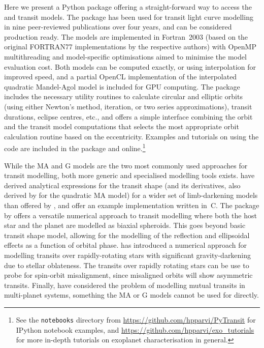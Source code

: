 \documentclass[usenatbib,usegraphicx,useAMS]{mn2e}
\begin{document}
Here we present a Python package offering a straight-forward way to access the \citet{Gimenez2006} and 
\cite{Mandel2002} transit models.  The package has been used for transit light curve modelling in nine
peer-reviewed publications over four years, and can be considered production ready. The models are implemented in
Fortran~2003 (based on the original FORTRAN77 implementations by the respective authors) with OpenMP multithreading and
model-specific optimisations aimed to minimise the model evaluation cost. Both models can be computed exactly, or using
interpolation for improved speed, and a partial OpenCL implementation of the interpolated quadratic Mandel-Agol model is
included for GPU computing. The package includes the necessary utility routines to calculate circular and elliptic
orbits (using either Newton's method, iteration, or two series approximations), transit durations, eclipse centres,
etc., and offers a simple interface combining the orbit and the transit model computations that selects the most
appropriate orbit calculation routine based on the eccentricity. Examples and tutorials on using the code are included
in the package and online.\footnote{See the \texttt{notebooks} directory from \url{https://github.com/hpparvi/PyTransit}
for IPython notebook examples, and \url{https://github.com/hpparvi/exo_tutorials} for more in-depth tutorials on
exoplanet characterisation in general.}

While the MA and G models are the two most commonly used approaches for transit modelling, both more 
generic and specialised modelling tools exists. \citet{Abubekerov2013} have derived analytical expressions 
for the transit shape (and its derivatives, also derived by \citet{Pal2008} for the quadratic MA model) for a wider set 
of limb-darkening models than offered by \citeauthor{Mandel2002}, and offer an example implementation written in~C. The 
 package by \citet{Southworth2008} offers a versatile numerical approach to transit modelling where 
both the host star and the planet are modelled as biaxial spheroids. This goes beyond basic transit shape model, 
allowing for the modelling of the reflection and ellipsoidal effects as a function of orbital phase. \citet{Barnes2009} 
has introduced a numerical approach for modelling transits over rapidly-rotating stars with significant 
gravity-darkening due to stellar oblateness. The transits over rapidly rotating stars can be use to probe for 
spin-orbit misalignment, since misaligned orbits will show asymmetric transits. Finally, \citet{Pal2012} have 
considered the problem of modelling mutual transits in multi-planet systems, something the MA or G models cannot be 
used for directly.
\end{document}
